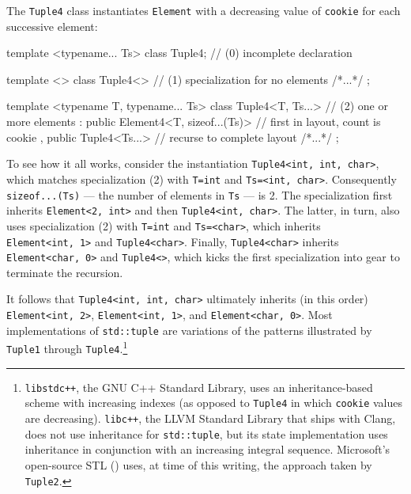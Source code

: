 \noindent The \lstinline!Tuple4! class instantiates \lstinline!Element! with a
decreasing value of \lstinline!cookie! for each successive element:

\begin{emcppslisting}[emcppsbatch=e37]
template <typename... Ts>
class Tuple4;                            // (0) incomplete declaration

template <>
class Tuple4<>                           // (1) specialization for no elements
{ /*...*/ };

template <typename T, typename... Ts>
class Tuple4<T, Ts...>                   // (2) one or more elements
    : public Element4<T, sizeof...(Ts)>  // first in layout, count is cookie
    , public Tuple4<Ts...>               // recurse to complete layout
{ /*...*/ };
\end{emcppslisting}
    

\noindent To see how it all works, consider the instantiation
\lstinline!Tuple4<int,!~\lstinline!int,!~\lstinline!char>!, which matches
specialization (2) with \lstinline!T=int! and
\lstinline!Ts=<int,!~\lstinline!char>!. Consequently \lstinline!sizeof...(Ts)!
--- the number of elements in \lstinline!Ts! --- is 2. The specialization
first inherits \lstinline!Element<2,!~\lstinline!int>! and then
\lstinline!Tuple4<int,!~\lstinline!char>!. The latter, in turn, also uses
specialization (2) with \lstinline!T=int! and \lstinline!Ts=<char>!, which
inherits \lstinline!Element<int,!~\lstinline!1>! and \lstinline!Tuple4<char>!.
Finally, \lstinline!Tuple4<char>! inherits
\lstinline!Element<char,!~\lstinline!0>! and \lstinline!Tuple4<>!, which kicks
the first specialization into gear to terminate the recursion.

It follows that \lstinline!Tuple4<int,!~\lstinline!int,!~\lstinline!char>!
ultimately inherits (in this order) \lstinline!Element<int,!~\lstinline!2>!,
\lstinline!Element<int,!~\lstinline!1>!, and
\lstinline!Element<char,!~\lstinline!0>!. Most implementations of
\lstinline!std::tuple! are variations of the patterns illustrated by
\lstinline!Tuple1! through \lstinline!Tuple4!.\footnote{\lstinline!libstdc++!, the GNU C++ Standard
Library, uses an inheritance-based scheme with increasing indexes (as
opposed to \lstinline!Tuple4! in which \lstinline!cookie! values are
decreasing). \lstinline!libc++!, the LLVM Standard Library that ships with
Clang, does not use inheritance for \lstinline!std::tuple!, but its state
implementation uses inheritance in conjunction with an increasing
integral sequence. Microsoft's open-source STL
(\cite{microsoftb}) uses, at time of this writing, the
approach taken by \lstinline!Tuple2!.}

